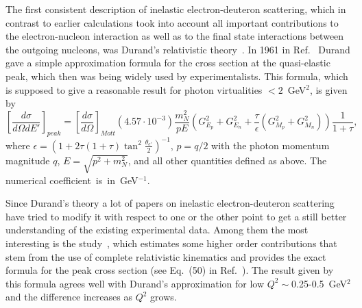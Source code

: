 The first consistent description of inelastic electron-deuteron scattering, which in contrast to earlier calculations took into account all important contributions to the electron-nucleon interaction as well as to the final state interactions between the outgoing nucleons, was Durand's relativistic theory~\cite{Durand:1959zz,Durand:1961zz}. In 1961 in Ref.~\cite{Durand:1961zz} Durand gave a simple approximation formula for the cross section at the quasi-elastic peak, which then was being widely used by experimentalists. This formula, which is supposed to give a reasonable result for photon virtualities $<2$~GeV$^{2}$, is given by
\begin{equation}
\left [ \frac{d\sigma}{d\Omega dE'} \right ]_{peak} = \left [ \frac{d\sigma}{d\Omega} \right ]_{Mott} ( 4.57\cdot 10^{-3}) \frac{m_{N}^{2}}{pE} \left (G_{E_{p}}^{2} + G_{E_{n}}^{2} + \frac{\tau}{\epsilon}(G_{M_{p}}^{2} + G_{M_{n}}^{2})  \right )\frac{1}{1+\tau},\label{eq:durand}
\end{equation}
where $\epsilon = \left (1 +2\tau(1+\tau)\tan^{2}\frac{\theta_{e'}}{2} \right )^{-1}$, $p = q/2$ with the photon momentum magnitude $q$, $E=\sqrt{p^{2} + m_{N}^{2}}$, and all other quantities defined as above. The numerical coefficient~is~in~GeV$^{-1}$.

Since Durand's theory a lot of papers on inelastic electron-deuteron scattering~\cite{Kocevar:1967,Budnitz:1969dt,Hanson:1973vf} have tried to modify it with respect to one or the other point to get a still better understanding of the existing experimental data. Among them the most interesting is the study~\cite{Kocevar:1967}, which estimates some higher order contributions that stem from the use of complete relativistic kinematics and provides the exact formula for the peak cross section (see Eq.~(50) in Ref.~\cite{Kocevar:1967}). The result given by this formula agrees well with Durand's approximation for low $Q^{2}\sim$0.25-0.5~GeV$^{2}$ and the difference increases as $Q^{2}$ grows.




